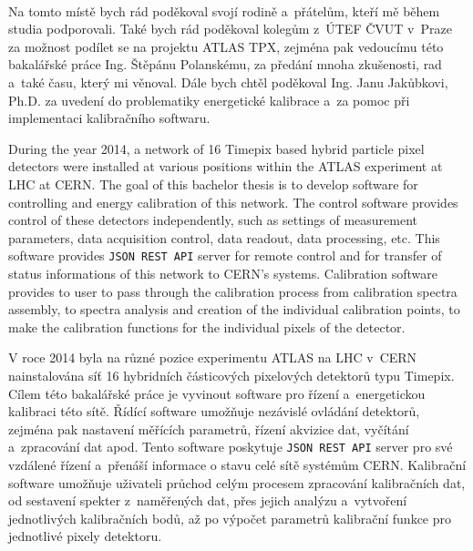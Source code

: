 \documentclass[11pt,twoside,a4paper]{book}
\begin{document}
	\translate				%


	\coverpagestarts

	\newpage~
	
	\newpage

	\acknowledgements
	\noindent
	Na tomto místě bych rád poděkoval svojí rodině a~přátelům, kteří mě během studia podporovali. Také bych rád poděkoval kolegům z~ÚTEF ČVUT v~Praze za možnost podílet se na projektu ATLAS TPX, zejména pak vedoucímu této bakalářské práce Ing. Štěpánu Polanskému, za předání mnoha zkušenosti, rad a~také času, který mi věnoval. Dále bych chtěl poděkoval Ing. Janu Jakůbkovi, Ph.D. za uvedení do problematiky energetické kalibrace a~za pomoc při implementaci kalibračního softwaru.





 
	\abstractpage

	During the year 2014, a network of 16 Timepix based hybrid particle pixel detectors were installed at various positions within the ATLAS experiment at LHC at CERN.
	The goal of this bachelor thesis is to develop software for controlling and energy calibration of this network. The control software provides control of these detectors independently, such as settings of measurement parameters, data acquisition control, data readout, data processing, etc. This software provides \texttt{JSON REST API} server for remote control and for transfer of status informations of this network to CERN's systems.
	Calibration software provides to user to pass through the calibration process from calibration spectra assembly, to spectra analysis and creation of the individual calibration points, to make the calibration functions for the individual pixels of the detector. 

	
	\baselineskip

	V roce 2014 byla na různé pozice experimentu ATLAS na LHC v~CERN nainstalována síť 16 hybridních částicových pixelových detektorů typu Timepix. 
	Cílem této bakalářské práce je vyvinout software pro řízení a~energetickou kalibraci této sítě. Řídící software umožňuje nezávislé ovládání detektorů, zejména pak nastavení měřících parametrů, řízení akvizice dat, vyčítání a~zpracování dat apod. Tento software poskytuje \texttt{JSON REST API} server pro své vzdálené řízení a~přenáší informace o stavu celé sítě systémům CERN.
	Kalibrační software umožňuje uživateli průchod celým procesem zpracování kalibračních dat, od sestavení spekter z~naměřených dat, přes jejich analýzu a~vytvoření jednotlivých kalibračních bodů, až po výpočet parametrů kalibrační funkce pro jednotlivé pixely detektoru.
\end{document}
